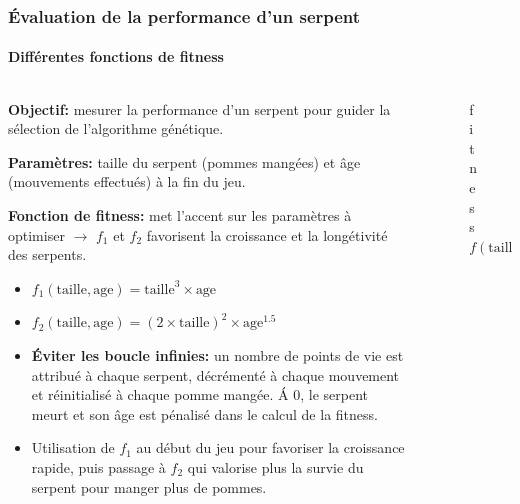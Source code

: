 \documentclass[10pt]{beamer}
\begin{document}
\begin{frame}
\frametitle{\'Evaluation de la performance d'un serpent}
\framesubtitle{Différentes fonctions de fitness}
\begin{columns}[T]
\begin{column}{0.60\textwidth}
\footnotesize
\textbf{Objectif:} mesurer la performance d'un serpent pour guider la sélection de l'algorithme génétique.

\vspace{0.1cm}
\textbf{Paramètres:} taille du serpent (pommes mangées) et âge (mouvements effectués) à la fin du jeu.

\vspace{0.1cm}
\textbf{Fonction de fitness:} met l'accent sur les paramètres à optimiser $\rightarrow$ $f_1$ et $f_2$ favorisent la croissance et la longétivité des serpents.
\begin{itemize}
  \footnotesize
  \item $f_1(\text{taille}, \text{age})=\text{taille}^3\times \text{age}$
  \item $f_2(\text{taille}, \text{age})=(2\times\text{taille})^2\times \text{age}^{1.5}$
  \item \textbf{\'Eviter les boucle infinies:} un nombre de points de vie est attribué à chaque serpent, décrémenté à chaque mouvement et réinitialisé à chaque pomme mangée. \'A 0, le serpent meurt et son âge est pénalisé dans le calcul de la fitness.
  \item Utilisation de $f_1$ au début du jeu pour favoriser la croissance rapide, puis passage à $f_2$ qui valorise plus la survie du serpent pour manger plus de pommes.
\end{itemize}

\end{column}

\begin{column}{0.40\textwidth}
\begin{figure}
\centering
\vspace{-0.5cm}
\vspace{-0.4cm}
\caption*{\tiny fitness $f(\text{taille}, \text{age})=\text{taille}^3\times \text{age}$}
\end{figure}


\end{column}
\end{columns}
\end{frame}
\end{document}
